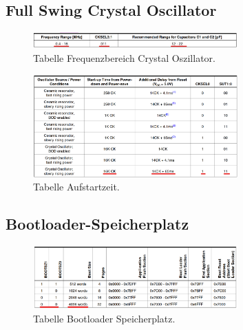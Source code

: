 \begin{appendix}
\subsection{Full Swing Crystal Oscillator}\label{Appendix:Full_Swing _Crystal_Oscillator}

\begin{figure}[h!]
	\centering
	\includegraphics[width=0.7\textwidth]{graphics/Tabelle_Crystal}
	\caption{Tabelle Frequenzbereich Crystal Oszillator.}
	\label{fig:Tabelle_Crystal}
\end{figure}


\newpage

\begin{figure}[h!]
	\centering
	\includegraphics[width=0.7\textwidth]{graphics/Tabelle_Crystal2}
	\caption{Tabelle Aufstartzeit.}
	\label{fig:Tabelle_Crystal2}
\end{figure}


\subsection{Bootloader-Speicherplatz}\label{Appendix:Bootloader-Speicherplatz}

\begin{figure}[h!]
	\centering
	\includegraphics[width=0.7\textwidth]{graphics/Tabelle_Bootloader}
	\caption{Tabelle Bootloader Speicherplatz.}
	\label{fig:Tabelle_Bootloader}
\end{figure}


\end{appendix}
